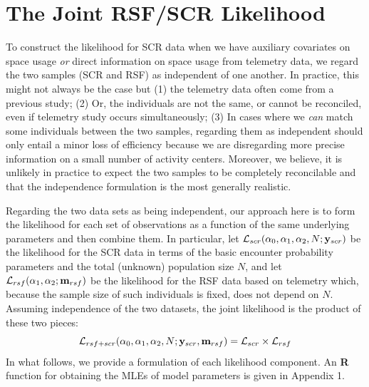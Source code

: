 \documentclass[12pt]{article}
\begin{document}
\section{The Joint RSF/SCR Likelihood}

To construct the likelihood for SCR data when we have auxiliary
covariates on space usage {\it or} direct information on space usage
from telemetry data, we regard the two samples (SCR and RSF) as
independent of one another. In practice, this might not always be the
case but (1) the telemetry data often come from a previous study;
(2) Or, the individuals are not the same, or cannot be reconciled, even if telemetry study occurs simultaneously;
(3) In cases where we {\it
  can} match some individuals between the two samples, regarding them as
independent should only entail a minor
loss of efficiency
because we are disregarding more precise information on a small number
of activity centers. Moreover, we believe, it is unlikely in practice
to expect the two samples to be completely reconcilable and that the
independence formulation is the most generally realistic.

Regarding the two data sets as being independent, our approach here
is to form the likelihood for each set of observations as a function
of the same underlying parameters and then combine them. In
particular, let ${\cal L}_{scr}(\alpha_{0}, \alpha_{1}, \alpha_{2}, N;
{\bf y}_{scr})$
be the likelihood for the SCR data in terms of the basic encounter
probability parameters and the total (unknown) population size $N$,
and let ${\cal L}_{rsf}(\alpha_{1},\alpha_{2}; {\bf m}_{rsf})$ be the
likelihood for the RSF data based on telemetry which, because the
sample size of such individuals is fixed, does not depend on $N$.
Assuming independence of the two datasets, the
joint likelihood is the product of these two pieces:
\[
{\cal L}_{rsf+scr}(\alpha_{0},\alpha_{1},\alpha_{2},N; {\bf y}_{scr},{\bf
  m}_{rsf})  = {\cal L}_{scr} \times {\cal L}_{rsf}
\]
In what follows, we provide a formulation of each likelihood
component. An  {\bf R} function for obtaining the MLEs of
model parameters is given in Appendix 1.
\end{document}
